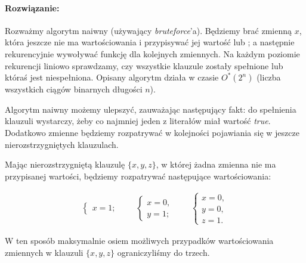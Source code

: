 \paragraph{Rozwiązanie: } Rozważmy algorytm naiwny (używający \textit{bruteforce}'a). Będziemy brać zmienną $x$, która jeszcze nie ma wartościowania i przypisywać jej wartość \true lub \false; a następnie rekurencyjnie wywoływać funkcję dla kolejnych zmiennych. Na każdym poziomie rekurencji liniowo sprawdzamy, czy wszystkie klauzule zostały spełnione lub któraś jest niespełniona. Opisany algorytm działa w czasie $O^*(2^n)$ (liczba wszystkich ciągów binarnych długości $n$).

Algorytm naiwny możemy ulepszyć, zauważając następujący fakt: do spełnienia klauzuli wystarczy, żeby co najmniej jeden z literałów miał wartość \textit{true}. Dodatkowo zmienne będziemy rozpatrywać w kolejności pojawiania się w jeszcze nierozstrzygniętych klauzulach.

Mając nierozstrzygniętą klauzulę $\{x, y, z\}$, w której żadna zmienna nie ma przypisanej wartości, będziemy rozpatrywać następujące wartościowania:

\begin{align*}
	\begin{cases}
		x = 1;
	\end{cases}
	\qquad
	\begin{cases}
		x = 0, \\
		y = 1;
	\end{cases}
	\qquad
	\begin{cases}
		x = 0, \\
		y = 0,\\
		z = 1.
	\end{cases}
\end{align*}

W ten sposób maksymalnie osiem możliwych przypadków wartościowania zmiennych w klauzuli $\{x, y, z\}$ ograniczyliśmy do trzech. 

